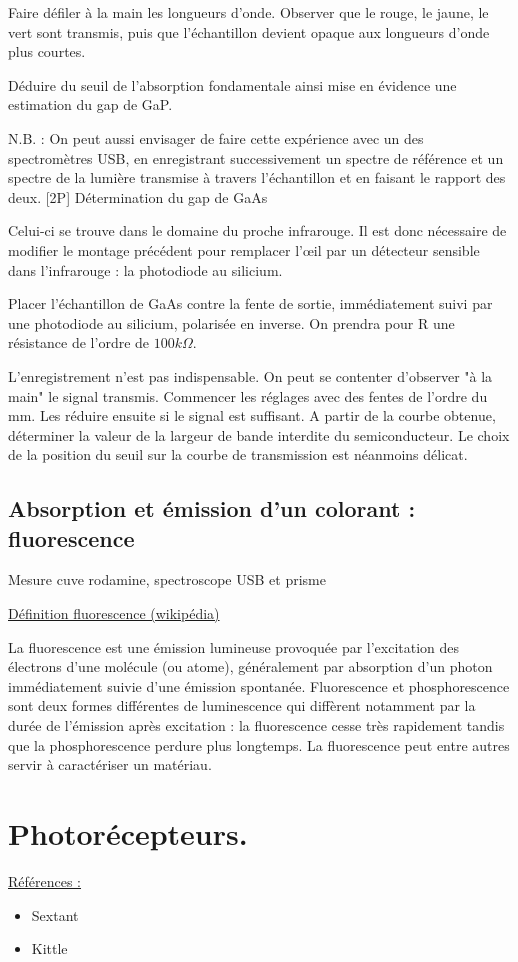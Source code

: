 \documentclass{article}%
\begin{document}
Faire défiler à la main les longueurs d'onde. Observer que le rouge, le jaune, le vert sont transmis, puis que l'échantillon devient opaque aux longueurs d'onde plus courtes.

Déduire du seuil de l'absorption fondamentale ainsi mise en évidence une estimation du gap de GaP.

N.B. : On peut aussi envisager de faire cette expérience avec un des spectromètres USB, en enregistrant successivement un spectre de référence et un spectre de la lumière transmise à travers l'échantillon et en faisant le rapport des deux.
[2P] Détermination du gap de GaAs

Celui-ci se trouve dans le domaine du proche infrarouge. Il est donc nécessaire de modifier le montage précédent pour remplacer l'œil par un détecteur sensible dans l'infrarouge : la photodiode au silicium.

Placer l'échantillon de GaAs contre la fente de sortie, immédiatement suivi par une photodiode au silicium, polarisée en inverse. On prendra pour R une résistance de l'ordre de $100 k\Omega$.


L'enregistrement n'est pas indispensable. On peut se contenter d'observer "à la main" le signal transmis. Commencer les réglages avec des fentes de l'ordre du mm. Les réduire ensuite si le signal est suffisant. A partir de la courbe obtenue, déterminer la valeur de la largeur de bande interdite du semiconducteur. Le choix de la position du seuil sur la courbe de transmission est néanmoins délicat.
\subsection{Absorption et émission d'un colorant : fluorescence}
Mesure cuve rodamine, spectroscope USB et prisme

\underline{Définition fluorescence (wikipédia)}

La fluorescence est une émission lumineuse provoquée par l'excitation des électrons d'une molécule (ou atome), généralement par absorption d'un photon immédiatement suivie d'une émission spontanée. Fluorescence et phosphorescence sont deux formes différentes de luminescence qui diffèrent notamment par la durée de l'émission après excitation : la fluorescence cesse très rapidement tandis que la phosphorescence perdure plus longtemps. La fluorescence peut entre autres servir à caractériser un matériau.


\section{Photorécepteurs.}
\underline{Références :}
\begin{itemize}
	\item Sextant
	\item Kittle
\end{itemize}
\end{document}
